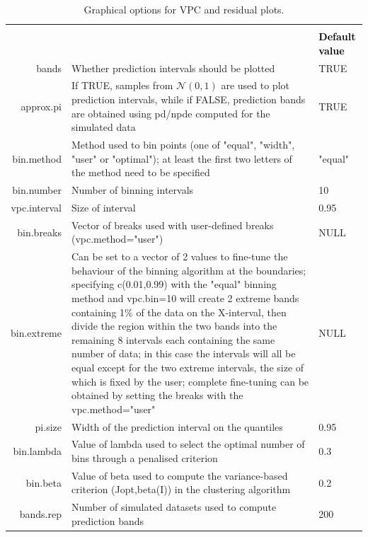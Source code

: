 \documentclass{report}
\begin{document}
\begin{table}[H] 
\begin{center}
\begin{tabular}{|r p{10cm} p{3cm} |}
\arrayrulecolor{black}\hline
& \centering {\textbf{\textcolor{black}{Graphical options for VPC and residual plots}}} & \\
\centering{\textbf{\textcolor{black}{Parameter}} }& \centering{\textbf{\textcolor{black}{Description }}} & \textbf{\textcolor{black}{Default value}} \\
\hline
{\ttfamily bands} & Whether prediction intervals should be plotted & TRUE \\
{\ttfamily approx.pi} & If TRUE, samples from $\mathcal{N}(0,1)$ are used to plot prediction intervals, while if FALSE, prediction bands are obtained using pd/npde computed for the simulated data & TRUE \\
{\sf bin.method} & Method used to bin points (one of "equal", "width", "user" or "optimal"); at least the first two letters of the method need to be specified & "equal" \\
{\ttfamily bin.number} & Number of binning intervals & 10 \\
{\ttfamily vpc.interval} & Size of interval & 0.95 \\
{\ttfamily bin.breaks} & Vector of breaks used with user-defined breaks (vpc.method="user") & NULL \\
{\ttfamily bin.extreme} & Can be set to a vector of 2 values to fine-tune the behaviour of the binning algorithm at the boundaries; specifying c(0.01,0.99) with the "equal" binning method and vpc.bin=10 will create 2 extreme bands containing 1\% of the data on the X-interval, then divide the region within the two bands into the remaining 8 intervals each containing the same number of data; in this case the intervals will all be equal except for the two extreme intervals, the size of which is fixed by the user; complete fine-tuning can be obtained by setting the breaks with the vpc.method="user" & NULL \\
{\ttfamily pi.size} & Width of the prediction interval on the quantiles & 0.95 \\
{\ttfamily bin.lambda} & Value of lambda used to select the optimal number of bins through a penalised criterion & 0.3 \\
{\ttfamily bin.beta} & Value of beta used to compute the variance-based criterion (Jopt,beta(I)) in the clustering algorithm & 0.2 \\
{\ttfamily bands.rep} & Number of simulated datasets used to compute prediction bands & 200 \\
\hline
\end{tabular} 
\end{center}
\caption{Graphical options for VPC and residual plots.} \label{tab:graphicalOptions4}
\end{table} 
\end{document}
